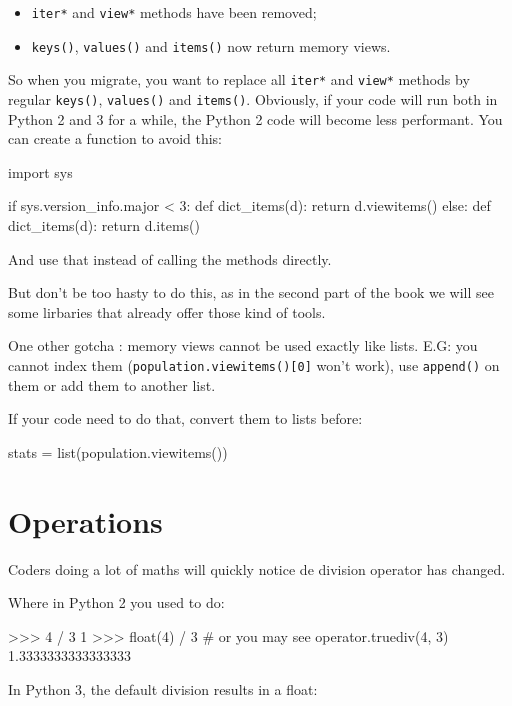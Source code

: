 \begin{itemize}
    \item \lstinline{iter*} and \lstinline{view*} methods have been removed;
    \item \lstinline{keys()}, \lstinline{values()} and \lstinline{items()} now return memory views.
\end{itemize}

So when you migrate, you want to replace all \lstinline{iter*} and \lstinline{view*} methods by regular \lstinline{keys()}, \lstinline{values()} and \lstinline{items()}. Obviously, if your code will run both in Python 2 and 3 for a while, the Python 2 code will become less performant. You can create a function to avoid this:

\begin{py2and3}
import sys

if sys.version_info.major < 3:
    def dict_items(d):
        return d.viewitems()
else:
    def dict_items(d):
        return d.items()
\end{py2and3}

And use that instead of calling the methods directly.

But don't be too hasty to do this, as in the second part of the book we will see some lirbaries that already offer those kind of tools.

One other gotcha : memory views cannot be used exactly like lists. E.G: you cannot index them (\lstinline{population.viewitems()[0]} won't work), use \lstinline{append()} on them or add them to another list.

If your code need to do that, convert them to lists before:

\begin{py3}
stats = list(population.viewitems())
\end{py3}

\section{Operations}

Coders doing a lot of maths will quickly notice de division operator has changed.

Where in Python 2 you used to do:

\begin{py2}
>>> 4 / 3
1
>>> float(4) / 3  # or you may see operator.truediv(4, 3)
1.3333333333333333
\end{py2}

In Python 3, the default division results in a float:

